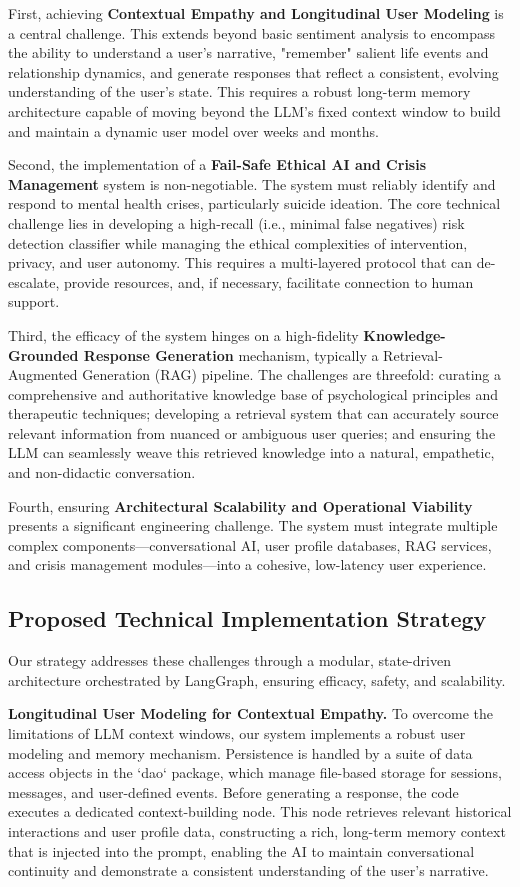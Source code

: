 First, achieving \textbf{Contextual Empathy and Longitudinal User Modeling} is a central challenge. This extends beyond basic sentiment analysis to encompass the ability to understand a user's narrative, "remember" salient life events and relationship dynamics, and generate responses that reflect a consistent, evolving understanding of the user's state. This requires a robust long-term memory architecture capable of moving beyond the LLM's fixed context window to build and maintain a dynamic user model over weeks and months.

Second, the implementation of a \textbf{Fail-Safe Ethical AI and Crisis Management} system is non-negotiable. The system must reliably identify and respond to mental health crises, particularly suicide ideation. The core technical challenge lies in developing a high-recall (i.e., minimal false negatives) risk detection classifier while managing the ethical complexities of intervention, privacy, and user autonomy. This requires a multi-layered protocol that can de-escalate, provide resources, and, if necessary, facilitate connection to human support.

Third, the efficacy of the system hinges on a high-fidelity \textbf{Knowledge-Grounded Response Generation} mechanism, typically a Retrieval-Augmented Generation (RAG) pipeline. The challenges are threefold: curating a comprehensive and authoritative knowledge base of psychological principles and therapeutic techniques; developing a retrieval system that can accurately source relevant information from nuanced or ambiguous user queries; and ensuring the LLM can seamlessly weave this retrieved knowledge into a natural, empathetic, and non-didactic conversation.

Fourth, ensuring \textbf{Architectural Scalability and Operational Viability} presents a significant engineering challenge. The system must integrate multiple complex components—conversational AI, user profile databases, RAG services, and crisis management modules—into a cohesive, low-latency user experience.

\subsection{Proposed Technical Implementation Strategy}

Our strategy addresses these challenges through a modular, state-driven architecture orchestrated by LangGraph, ensuring efficacy, safety, and scalability.

\textbf{Longitudinal User Modeling for Contextual Empathy.} To overcome the limitations of LLM context windows, our system implements a robust user modeling and memory mechanism. Persistence is handled by a suite of data access objects in the `dao` package, which manage file-based storage for sessions, messages, and user-defined events. Before generating a response, the code executes a dedicated context-building node. This node retrieves relevant historical interactions and user profile data, constructing a rich, long-term memory context that is injected into the prompt, enabling the AI to maintain conversational continuity and demonstrate a consistent understanding of the user's narrative.

